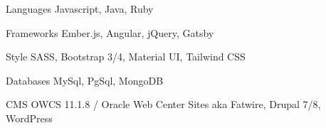 
\begin{cvskills}
  \cvskill
    {Languages} %
    {Javascript, Java, Ruby} %

  \cvskill
    {Frameworks} %
    {Ember.js, Angular, jQuery, Gatsby} %

  \cvskill
    {Style} %
    {SASS, Bootstrap 3/4, Material UI, Tailwind CSS} %

  \cvskill
    {Databases} %
    {MySql, PgSql, MongoDB} %

  \cvskill
    {CMS} %
    {OWCS 11.1.8 / Oracle Web Center Sites aka Fatwire, Drupal 7/8, WordPress} %
  
\end{cvskills}